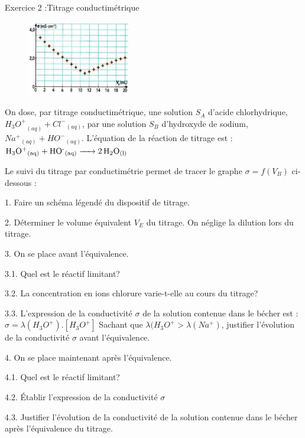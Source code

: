\documentclass[12pt, french]{article}
\begin{document}
\begin{Box2}{Exercice 2 :Titrage conductimétrique 
 }
   \begin{figure}
  \begin{center}
    \includegraphics[width=0.4\textwidth]{./Screenshot from 2022-05-11 17-55-37.png}
  \end{center}
\end{figure}



   On dose, par titrage conductimétrique, une solution $S_A$ d'acide chlorhydrique, ${H_3O^+}_{(aq)} + {Cl^-}_{(aq)}$, par une solution
$S_B$ d'hydroxyde de sodium, ${Na^+}_{(aq)} + {HO^-}_{(aq)}$. L'équation de la réaction de titrage est :
   \\$\ce{{H_3O^+}_{(aq)} + {HO^-}_{(aq)} -> 2{H_2O}_{(l)}}$

Le suivi du titrage par conductimétrie permet de tracer le graphe $\sigma = f(V_B)$ ci-dessous :

   1. Faire un schéma légendé du dispositif de titrage.

2. Déterminer le volume équivalent $V_E$ du titrage. On néglige la dilution lors du titrage.

3. On se place avant l'équivalence.

      3.1. Quel est le réactif limitant?

      3.2. La concentration en ions chlorure varie-t-elle au cours du
titrage?

      3.3. L'expression de la conductivité $\sigma$ de la solution contenue
   dans le bécher est : $\sigma = \lambda(H_3O^+).[H_3O^+]$ Sachant que $\lambda( H_3O^+> \lambda( Na^+)$, justifier l'évolution de la conductivité $\sigma$ avant l'équivalence.

   4. On se place maintenant après l'équivalence.

   4.1. Quel est le réactif limitant?

   4.2. Établir l'expression de la conductivité $\sigma$

   4.3. Justifier l'évolution de la conductivité de la solution
contenue dans le bécher après l'équivalence du titrage.
\end{Box2}
\end{document}
